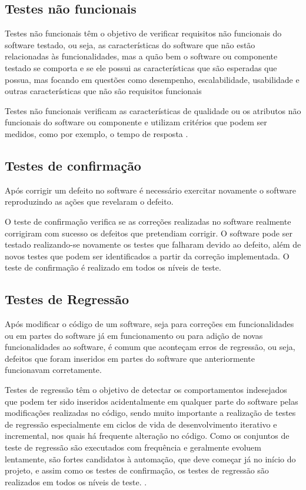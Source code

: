         \subsection{Testes não funcionais}
        \label{section:testes-nao-funcionais}
        
        Testes não funcionais têm o objetivo de verificar requisitos não funcionais do software testado, ou seja, as características do software que não estão relacionadas às funcionalidades, mas a quão bem o software ou componente testado se comporta e se ele possui as características que são esperadas que possua, mas focando em questões como desempenho, escalabilidade, usabilidade e outras características que não são requisitos funcionais
        
        Testes não funcionais verificam as características de qualidade ou os atributos não funcionais do software ou componente e utilizam critérios que podem ser medidos, como por exemplo, o tempo de resposta \cite{ISQTB2019}.
        
         \subsection{Testes de confirmação}
        Após corrigir um defeito no software é necessário exercitar novamente o software reproduzindo as ações que revelaram o defeito.
        
        O teste de confirmação verifica se as correções realizadas no software realmente corrigiram com sucesso os defeitos que pretendiam corrigir. O software pode ser testado realizando-se novamente os testes que falharam devido ao defeito, além de novos testes que podem ser identificados a partir da correção implementada. O teste de confirmação é realizado em todos os níveis de teste. \cite{ISQTB2019}
        
        \subsection{Testes de Regressão}
        
       Após modificar o código de um software, seja para correções em funcionalidades ou em partes do software já em funcionamento ou para adição de novas funcionalidades ao software, é comum que aconteçam erros de regressão, ou seja, defeitos que foram inseridos em partes do software que anteriormente funcionavam corretamente.
       
       Testes de regressão têm o objetivo de detectar os comportamentos indesejados que podem ter sido inseridos acidentalmente em qualquer parte do software pelas modificações realizadas no código, sendo muito importante a realização de testes de regressão especialmente em ciclos de vida de desenvolvimento iterativo e incremental, nos quais há frequente alteração no código. Como os conjuntos de teste de regressão são executados com frequência e geralmente evoluem lentamente, são fortes candidatos à automação, que deve começar já no início do projeto, e assim como os testes de confirmação, os testes de regressão são realizados em todos os níveis de teste. \cite{ISQTB2019}.
       
